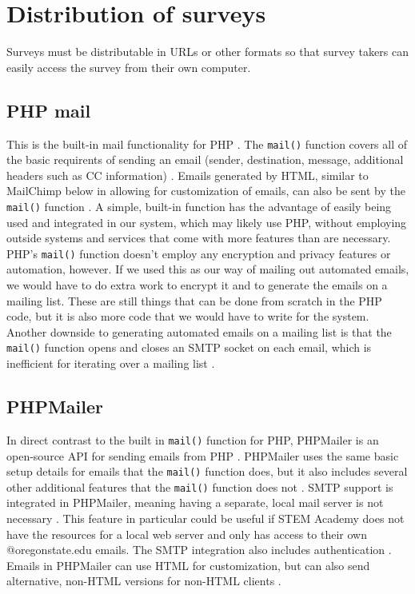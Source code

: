 \documentclass{IEEEtran}
\begin{document}
\section{Distribution of surveys}
Surveys must be distributable in URLs or other formats so that survey takers can easily access the survey from their own computer.
\subsection{PHP mail}
This is the built-in mail functionality for PHP \cite{php_mail}.
The \texttt{mail()} function covers all of the basic requirents of sending an email (sender, destination, message, additional headers such as CC information) \cite{php_mail}.
Emails generated by HTML, similar to MailChimp below in allowing for customization of emails, can also be sent by the \texttt{mail()} function \cite{php_mail}.
A simple, built-in function has the advantage of easily being used and integrated in our system, which may likely use PHP, without employing outside systems and services that come with more features than are necessary.
PHP's \texttt{mail()} function doesn't employ any encryption and privacy features or automation, however.
If we used this as our way of mailing out automated emails, we would have to do extra work to encrypt it and to generate the emails on a mailing list.
These are still things that can be done from scratch in the PHP code, but it is also more code that we would have to write for the system.
Another downside to generating automated emails on a mailing list is that the \texttt{mail()} function opens and closes an SMTP socket on each email, which is inefficient for iterating over a mailing list \cite{php_mail}.
\subsection{PHPMailer}
In direct contrast to the built in \texttt{mail()} function for PHP, PHPMailer is an open-source API for sending emails from PHP \cite{phpmailer}.
PHPMailer uses the same basic setup details for emails that the \texttt{mail()} function does, but it also includes several other additional features that the \texttt{mail()} function does not \cite{phpmailer}.
SMTP support is integrated in PHPMailer, meaning having a separate, local mail server is not necessary \cite{phpmailer}.
This feature in particular could be useful if STEM Academy does not have the resources for a local web server and only has access to their own @oregonstate.edu emails.
The SMTP integration also includes authentication \cite{phpmailer}.
Emails in PHPMailer can use HTML for customization, but can also send alternative, non-HTML versions for non-HTML clients \cite{phpmailer}.
\end{document}
